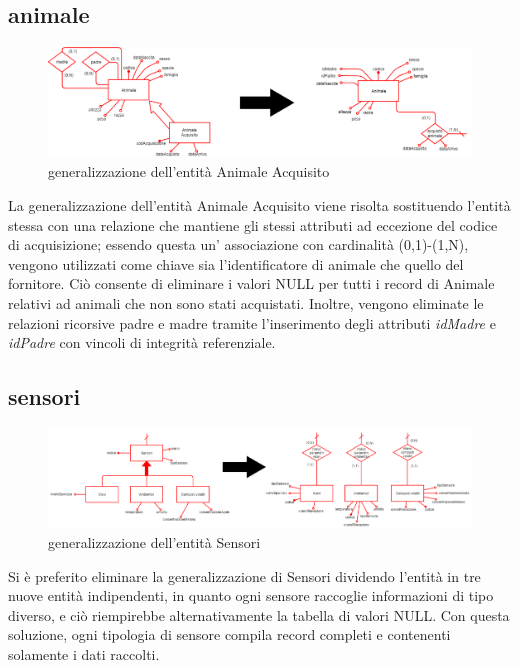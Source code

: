 \documentclass[12pt,a4paper]{article}
\begin{document}
\subsection{animale}
\begin{figure}[H]
\centering
\includegraphics[scale=2, width=1.15\textwidth]{ridondanze/animale.png}
\caption{ge\-ne\-ra\-liz\-za\-zio\-ne dell'entità Animale Acquisito}
\end{figure}
La ge\-ne\-ra\-liz\-za\-zio\-ne dell'entità Animale Acquisito viene risolta sostituendo l'entità stessa con una relazione che mantiene gli stessi attributi ad eccezione del codice di acquisizione; essendo questa un' associazione con cardinalità (0,1)-(1,N), vengono utilizzati come chiave sia l'identificatore di animale che quello del fornitore. Ciò consente di eliminare i valori NULL per tutti i record di Animale relativi ad animali che non sono stati acquistati. Inoltre, vengono eliminate le relazioni ricorsive padre e madre tramite l'inserimento degli attributi \textit{idMadre} e \textit{idPadre} con vincoli di integrità referenziale.
\subsection{sensori}
\begin{figure}[H]
\centering
\includegraphics[scale=2, width=1.15\textwidth]{ridondanze/sensori.png}
\caption{ge\-ne\-ra\-liz\-za\-zio\-ne dell'entità Sensori}
\end{figure}
Si è preferito eliminare la ge\-ne\-ra\-liz\-za\-zio\-ne di Sensori dividendo l'entità in tre nuove entità indipendenti, in quanto ogni sensore raccoglie informazioni di tipo diverso, e ciò riempirebbe alternativamente la tabella di valori NULL. Con questa soluzione, ogni tipologia di sensore compila record completi e contenenti solamente i dati raccolti.
\end{document}
